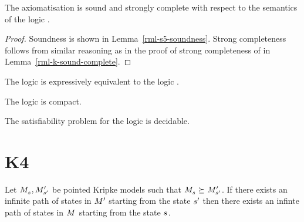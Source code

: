 \begin{theorem}
The axiomatisation \axiomRmlS{} is sound and strongly complete with respect to the semantics of the logic \logicRmlS{}.
\end{theorem}

\begin{proof}
Soundness is shown in Lemma~\ref{rml-s5-soundness}.
Strong completeness follows from similar reasoning as in the proof of strong completeness of \logicRmlK{} in Lemma~\ref{rml-k-sound-complete}.
\end{proof}

\begin{corollary}
The logic \logicRmlS{} is expressively equivalent to the logic \logicS{}.
\end{corollary}

\begin{corollary}
The logic \logicRmlS{} is compact.
\end{corollary}

\begin{corollary}
The satisfiability problem for the logic \logicRmlS{} is decidable.
\end{corollary}

\section{K4}

\begin{lemma}\label{refinements-infinite-paths}
Let $\kPModel{\kStateS}, \kPModelP{\kStateSP}$ be pointed Kripke models such that $\kPModel{\kStateS} \simulates \kPModelP{\kStateSP}$.
If there exists an infinite path of states in ${M^{\prime}_{}}$ starting from the state ${s}^{\prime}$ then there exists an infinte path of states in $\kModel$ starting from the state $\kStateS$.
\end{lemma}

